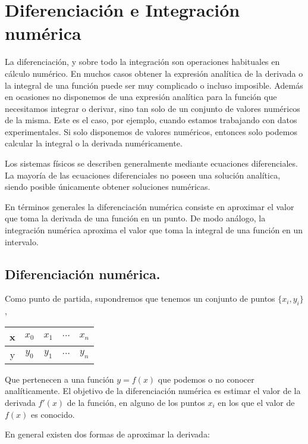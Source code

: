 \chapter{Diferenciación e Integración numérica}

La diferenciación, y sobre todo la integración son operaciones habituales en cálculo numérico. En muchos casos obtener la expresión analítica de la derivada o la integral de una función puede ser muy complicado o incluso imposible. Además en ocasiones no disponemos de una expresión analítica para la función que necesitamos integrar o derivar, sino tan solo de un conjunto de valores numéricos de la misma. Este es el caso, por ejemplo, cuando estamos trabajando con datos experimentales. Si solo disponemos de valores numéricos, entonces solo podemos calcular la integral o la derivada numéricamente.

Los sistemas físicos se describen generalmente mediante ecuaciones diferenciales.  La mayoría de las ecuaciones diferenciales no poseen una solución analítica, siendo posible únicamente obtener soluciones numéricas. 

En términos generales la diferenciación numérica consiste en aproximar el valor que toma la derivada de una función en un punto. De modo análogo, la integración numérica aproxima el valor que toma la integral de una función en un intervalo.

\section{Diferenciación numérica.}

Como punto de partida, supondremos que tenemos un conjunto de puntos $\{x_i,y_i\}$,
\begin{table}[h]
\centering
\begin{tabular}{c|cccc}
x&$x_0$&$x_1$&$\cdots$&$x_n$\\
\hline
y&$y_0$&$y_1$&$\cdots$&$y_n$
\end{tabular}
\end{table} 

Que pertenecen a una función $y=f(x)$ que podemos o no conocer analíticamente. El objetivo de la diferenciación numérica es estimar el valor de la derivada $f'(x)$ de la función, en alguno de los puntos $x_i$ en los que el valor de $f(x)$ es conocido. 

En general existen dos formas de aproximar la derivada:

